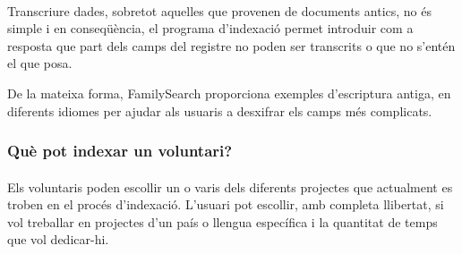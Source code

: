         \paragraph{}
        Transcriure dades, sobretot aquelles que provenen de documents antics, no és simple i en conseqüència, el programa d’indexació permet introduir com a resposta que part dels camps del registre no poden ser transcrits o que no s'entén el que posa.

        De la mateixa forma, FamilySearch proporciona exemples d’escriptura antiga, en diferents idiomes per ajudar als usuaris a desxifrar els camps més complicats.


    \subsubsection{Què pot indexar un voluntari?}

        \paragraph{}
        Els voluntaris poden escollir un o varis dels diferents projectes que actualment es troben en el procés d’indexació. L’usuari pot escollir, amb completa llibertat, si vol treballar en projectes d’un país o llengua específica i la quantitat de temps que vol dedicar-hi.
